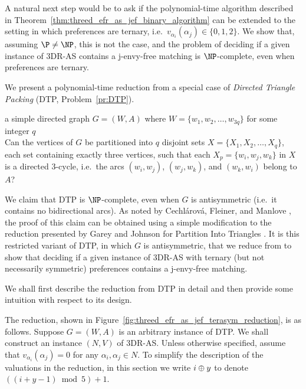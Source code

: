 A natural next step would be to ask if the polynomial-time algorithm described in Theorem~\ref{thm:threed_efr_as_jef_binary_algorithm} can be extended to the setting in which preferences are ternary, i.e.\ $v_{\alpha_i}(\alpha_j) \in \{ 0, 1, 2 \}$. We show that, assuming $\P \neq \NP$, this is not the case, and the problem of deciding if a given instance of 3DR-AS contains a j-envy-free matching is $\NP$-complete, even when preferences are ternary.

We present a polynomial-time reduction from a special case of \emph{Directed Triangle Packing} (DTP, Problem~\ref{pr:DTP}).

\begin{myproblem}
\label{pr:DTP}
\begin{samepage}
\begin{adjustwidth}{8pt}{8pt}
\inp a simple directed graph $G=(W, A)$ where $W=\{ w_1, w_2, \dots, w_{3q} \}$ for some integer $q$\\
\ques Can the vertices of $G$ be partitioned into $q$ disjoint sets $X=\{X_1, X_2, \dots, X_q\}$, each set containing exactly three vertices, such that each $X_p=\{ w_i,w_j,w_k \}$ in $X$ is a directed $3$-cycle, i.e.\ the arcs $( w_i,w_j )$, $( w_j, w_k )$, and $( w_k, w_i )$ belong to $A$?
\end{adjustwidth}
\end{samepage}
\end{myproblem}

We claim that DTP is $\NP$-complete, even when $G$ is antisymmetric (i.e.\ it contains no bidirectional arcs). As noted by Cechl\'arov\'a, Fleiner, and Manlove \cite{CFM05}, the proof of this claim can be obtained using a simple modification to the reduction presented by Garey and Johnson for Partition Into Triangles \cite[Theorem~3.7]{GJ79}. It is this restricted variant of DTP, in which $G$ is antisymmetric, that we reduce from to show that deciding if a given instance of 3DR-AS with ternary (but not necessarily symmetric) preferences contains a j-envy-free matching.

We shall first describe the reduction from DTP in detail and then provide some intuition with respect to its design. 

The reduction, shown in Figure~\ref{fig:threed_efr_as_jef_terasym_reduction}, is as follows. Suppose $G=(W, A)$ is an arbitrary instance of DTP. We shall construct an instance $(N, V)$ of 3DR-AS. Unless otherwise specified, assume that $v_{\alpha_i}(\alpha_j)=0$ for any $\alpha_i, \alpha_j \in N$. To simplify the description of the valuations in the reduction, in this section we write $i \oplus y$ to denote $((i + y - 1) \bmod 5) + 1$.

